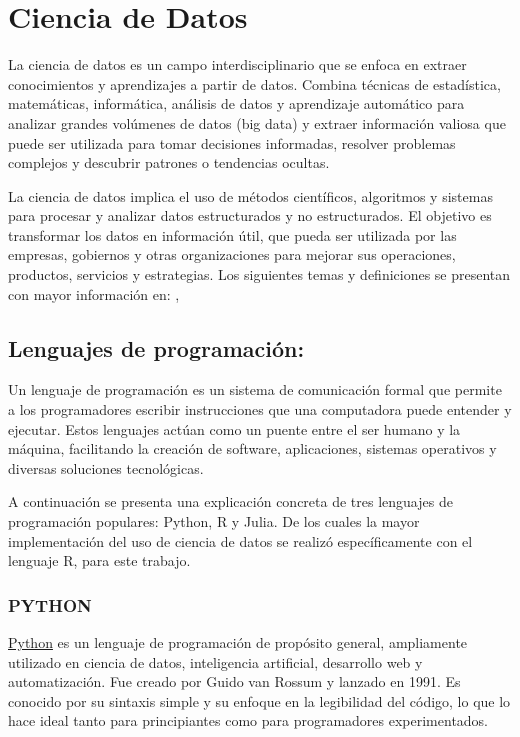 \documentclass[
  us-letterpaper,
]{scrreprt}
\theoremstyle{plain}
\theoremstyle{plain}
\theoremstyle{definition}
\theoremstyle{remark}
\begin{document}
\chapter{Ciencia de Datos}\label{ciencia-de-datos}

La ciencia de datos es un campo interdisciplinario que se enfoca en
extraer conocimientos y aprendizajes a partir de datos. Combina técnicas
de estadística, matemáticas, informática, análisis de datos y
aprendizaje automático para analizar grandes volúmenes de datos (big
data) y extraer información valiosa que puede ser utilizada para tomar
decisiones informadas, resolver problemas complejos y descubrir patrones
o tendencias ocultas.

La ciencia de datos implica el uso de métodos científicos, algoritmos y
sistemas para procesar y analizar datos estructurados y no
estructurados. El objetivo es transformar los datos en información útil,
que pueda ser utilizada por las empresas, gobiernos y otras
organizaciones para mejorar sus operaciones, productos, servicios y
estrategias. Los siguientes temas y definiciones se presentan con mayor
información en: \autocite{peng2016r}, \autocite{wickham2023r}

\section{Lenguajes de programación:}\label{lenguajes-de-programaciuxf3n}

Un lenguaje de programación es un sistema de comunicación formal que
permite a los programadores escribir instrucciones que una computadora
puede entender y ejecutar. Estos lenguajes actúan como un puente entre
el ser humano y la máquina, facilitando la creación de software,
aplicaciones, sistemas operativos y diversas soluciones tecnológicas.

A continuación se presenta una explicación concreta de tres lenguajes de
programación populares: Python, R y Julia. De los cuales la mayor
implementación del uso de ciencia de datos se realizó específicamente
con el lenguaje R, para este trabajo.

\subsection{PYTHON}\label{python}

\href{https://www.python.org/}{Python} es un lenguaje de programación de
propósito general, ampliamente utilizado en ciencia de datos,
inteligencia artificial, desarrollo web y automatización. Fue creado por
Guido van Rossum y lanzado en 1991. Es conocido por su sintaxis simple y
su enfoque en la legibilidad del código, lo que lo hace ideal tanto para
principiantes como para programadores experimentados.
\end{document}
